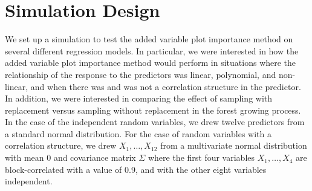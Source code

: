 \documentclass[12pt,twoside]{reedthesis}
\theoremstyle{definition}
\theoremstyle{definition}
\theoremstyle{definition}
\theoremstyle{remark}
\begin{document}
\section{Simulation Design}\label{simulation-design}

We set up a simulation to test the added variable plot importance method
on several different regression models. In particular, we were
interested in how the added variable plot importance method would
perform in situations where the relationship of the response to the
predictors was linear, polynomial, and non-linear, and when there was
and was not a correlation structure in the predictor. In addition, we
were interested in comparing the effect of sampling with replacement
versus sampling without replacement in the forest growing process. In
the case of the independent random variables, we drew twelve predictors
from a standard normal distribution. For the case of random variables
with a correlation structure, we drew \(X_1,\ldots,X_{12}\) from a
multivariate normal distribution with mean 0 and covariance matrix
\(\Sigma\) where the first four variables \(X_1,\ldots,X_4\) are
block-correlated with a value of 0.9, and with the other eight variables
independent. \par 
\begin{table}

\caption{\label{tab:kable}Covariance Matrix for Correlated Predictors}
\centering
{}
\end{table}
\end{document}
